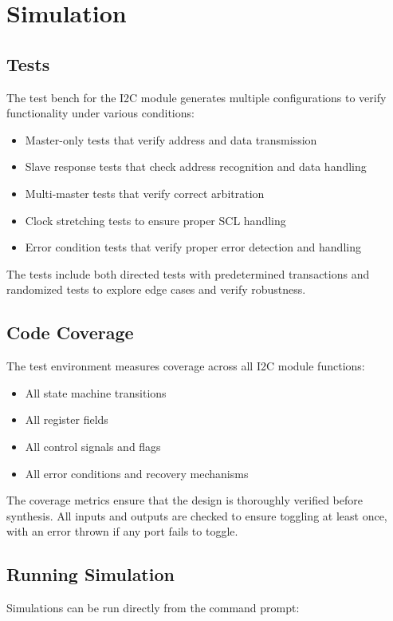 \section{Simulation}

\subsection{Tests}
The test bench for the I2C module generates multiple configurations to verify functionality under various conditions:

\begin{itemize}
    \item Master-only tests that verify address and data transmission
    \item Slave response tests that check address recognition and data handling
    \item Multi-master tests that verify correct arbitration
    \item Clock stretching tests to ensure proper SCL handling
    \item Error condition tests that verify proper error detection and handling
\end{itemize}

The tests include both directed tests with predetermined transactions and randomized tests to explore edge cases and verify robustness.

\subsection{Code Coverage}
The test environment measures coverage across all I2C module functions:

\begin{itemize}
    \item All state machine transitions
    \item All register fields
    \item All control signals and flags
    \item All error conditions and recovery mechanisms
\end{itemize}

The coverage metrics ensure that the design is thoroughly verified before synthesis. All inputs and outputs are checked to ensure toggling at least once, with an error thrown if any port fails to toggle.

\subsection{Running Simulation}
Simulations can be run directly from the command prompt:

